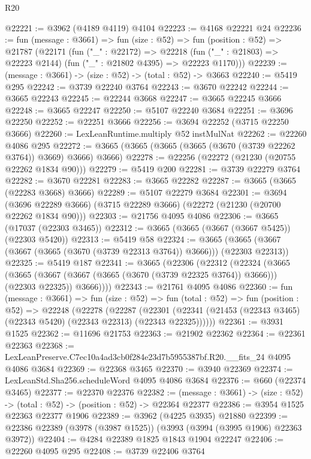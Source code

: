 \begin{lexlean}{R20}
\begin{coremodule}
@22221 := @3962 (@4189 @4119) @4104
@22223 := @4168 @22221 @24
@22236 := fun (message : @3661) =>
  fun (size : @52) =>
  fun (position : @52) =>
  @21787
    (@22171
      (fun ("_" : @22172) =>
      @22218 (fun ("_" : @21803) => @22223 @2144) (fun ("_" : @21802 @4395) => @22223 @1170)))
@22239 := (message : @3661) -> (size : @52) -> (total : @52) -> @3663
@22240 := @5419 @295
@22242 := @3739 @22240 @3764
@22243 := @3670 @22242
@22244 := @3665 @22243
@22245 := @22244 @3668
@22247 := @3665 @22245 @3666
@22248 := @3665 @22247
@22250 := @5107 @22240 @3684
@22251 := @3696 @22250
@22252 := @22251 @3666
@22256 := @3694 @22252 (@3715 @22250 @3666)
@22260 := LexLeanRuntime.multiply @52 instMulNat
@22262 := @22260 @4086 @295
@22272 := @3665 (@3665 (@3665 (@3665 (@3670 (@3739 @22262 @3764)) @3669) @3666) @3666)
@22278 := @22256 (@22272 (@21230 (@20755 @22262 @1834 @90)))
@22279 := @5419 @200
@22281 := @3739 @22279 @3764
@22282 := @3670 @22281
@22283 := @3665 @22282
@22287 := @3665 (@3665 (@22283 @3668) @3666)
@22289 := @5107 @22279 @3684
@22301 := @3694
    (@3696 @22289 @3666)
    (@3715 @22289 @3666)
    (@22272 (@21230 (@20700 @22262 @1834 @90)))
@22303 := @21756 @4095 @4086
@22306 := @3665 (@17037 (@22303 @3465))
@22312 := @3665 (@3665 (@3667 (@3667 @5425)) (@22303 @5420))
@22313 := @5419 @58
@22324 := @3665 (@3665 (@3667 (@3667 (@3665 (@3670 (@3739 @22313 @3764)) @3666))) (@22303 @22313))
@22325 := @5419 @187
@22341 := @3665
    (@22306
      (@22312
        (@22324
          (@3665
            (@3665 (@3667 (@3667 (@3665 (@3670 (@3739 @22325 @3764)) @3666))) (@22303 @22325))
            @3666))))
@22343 := @21761 @4095 @4086
@22360 := fun (message : @3661) =>
  fun (size : @52) =>
  fun (total : @52) =>
  fun (position : @52) =>
  @22248
    (@22278
      (@22287
        (@22301 (@22341 (@21453 (@22343 @3465) (@22343 @5420) (@22343 @22313) (@22343 @22325))))))
@22361 := @3931 @1525
@22362 := @11696 @21753
@22363 := @21902 @22362
@22364 := @22361 @22363
@22368 := LexLeanPreserve.C7ec10a4ad3cb0f284e23d7b5955387bf.R20.__fits_24 @4095 @4086 @3684
@22369 := @22368 @3465
@22370 := @3940 @22369
@22374 := LexLeanStd.Sha256.scheduleWord @4095 @4086 @3684
@22376 := @660 (@22374 @3465)
@22377 := @22370 @22376
@22382 := (message : @3661) -> (size : @52) -> (total : @52) -> (position : @52) -> @22364 @22377
@22386 := @3954 @1525 @22363 @22377 @1906
@22389 := @3962 (@4225 @3935) @21880
@22399 := @22386 @22389 (@3978 (@3987 @1525)) (@3993 (@3994 (@3995 @1906) @22363 @3972))
@22404 := @4284 @22389 @1825 @1843 @1904 @22247
@22406 := @22260 @4095 @295
@22408 := @3739 @22406 @3764

\end{coremodule}
\end{lexlean}
